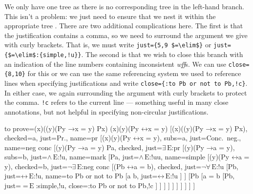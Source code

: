 \documentclass[10pt,british,a4paper,doc2]{ltxdoc}
\newcommand*{\lif}{\ensuremath{\mathbin{\rightarrow}}}
\newcommand*{\liff}{\ensuremath{\mathbin{\leftrightarrow}}}
\newcommand*{\elim}{\,\text{E}}
\newcommand*\wff{\emph{wff}}
\begin{document}
We only have one tree \nyth*{} as there is no corresponding tree in the left-hand branch.
This isn't a problem: we just need to ensure that we nest it within the appropriate tree \nyth[9].
There are two additional complications here.
The first is that the justification contains a comma, so we need to surround the argument we give  with curly brackets.
That is, we must write \verb|just={5,9 $=\elim$}| or \verb|just={$=\elim$:{simple,!u}}|.
The second is that we wish to close this branch with an indication of the line numbers containing inconsistent \wff{}s.
We can use \verb|close={8,10}| for this or we can use the same referencing system we used to reference lines when specifying justifications and write \verb|close={:to Pb or not to Pb,!c}|.
In either case, we again surrounding the argument with curly brackets to protect the comma.
\verb|!c| refers to the current line --- something useful in many close annotations, but not helpful in specifying non-circular justifications.
\begin{latexcode}
\begin{tableau}
  {
    to prove={(\exists x)((\forall y)(Py \lif x = y) \land Px) \sststile{}{} (\exists x)(\forall y)(Py \liff x = y)}
  }
  [{(\exists x)((\forall y)(Py \lif x = y) \land Px)}, checked=a, just=Pr., name=pr
    [{\lnot (\exists x)(\forall y)(Py \liff x = y)}, subs=a, just=Conc.~neg., name=neg conc
      [{(\forall y)(Py \lif a = y) \land Pa}, checked, just=$\exists\elim$:pr
        [{(\forall y)(Py \lif a = y)}, subs=b, just=$\land\elim$:!u, name=mark
          [Pa, just=$\land\elim$:!uu, name=simple
            [{\lnot (\forall y)(Py \liff a = y)}, checked=b, just=$\lnot\exists\elim$:neg conc
              [{\lnot (Pb \liff a = b)}, checked, just=$\lnot\forall\elim$:!u
                [Pb, just=$\liff\elim$:!u, name=to Pb or not to Pb
                 [a \neq b, just=$\liff\elim$:!u
                 ]
                ]
                [\lnot Pb
                 [{a = b}
                    [Pb, just={$=\elim$:{simple,!u}}, close={:to Pb or not to Pb,!c}
                    ]
                 ]
                ]
              ]
            ]
          ]
        ]
      ]
    ]
  ]
\end{tableau}
\end{latexcode}
\end{document}
